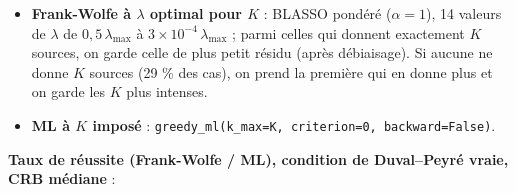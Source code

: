 \documentclass[
  french,
]{article}
\providecommand{\tightlist}{%
  \setlength{\itemsep}{0pt}\setlength{\parskip}{0pt}}
\begin{document}
\begin{itemize}
\tightlist
\item
  \textbf{Frank-Wolfe à \(\lambda\) optimal pour \(K\)} : BLASSO pondéré
  (\(\alpha = 1\)), 14 valeurs de \(\lambda\) de
  \(0{,}5\,\lambda_{\max}\) à \(3\times 10^{-4}\,\lambda_{\max}\) ;
  parmi celles qui donnent exactement \(K\) sources, on garde celle de
  plus petit résidu (après débiaisage). Si aucune ne donne \(K\) sources
  (29 \% des cas), on prend la première qui en donne plus et on garde
  les \(K\) plus intenses.
\item
  \textbf{ML à \(K\) imposé} :
  \texttt{greedy\_ml(k\_max=K,\ criterion=0,\ backward=False)}.
\end{itemize}

\textbf{Taux de réussite (Frank-Wolfe / ML), condition de Duval--Peyré
vraie, CRB médiane} :
\end{document}

